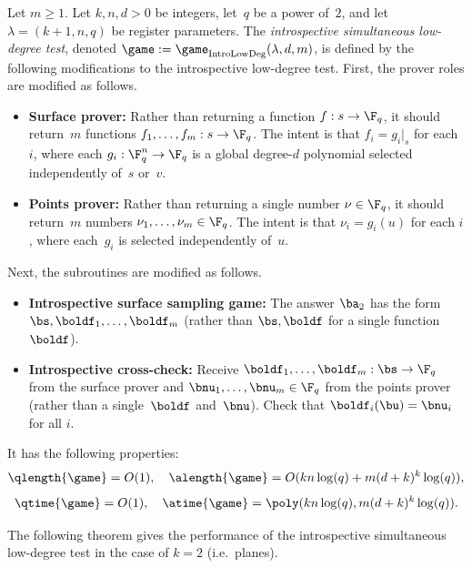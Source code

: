 \begin{definition}
Let $m \geq 1$.
Let $k, n, d>0$ be integers, let~$q$ be a power of~$2$,
and let $\lambda = (k+1, n, q)$ be register parameters.
The \emph{introspective simultaneous low-degree test}, denoted $\game :=\game_{\mathrm{IntroLowDeg}}(\lambda, d, m)$,
is defined by the following modifications to the introspective low-degree test.
First, the prover roles are modified as follows.
\begin{itemize}
\item[$\circ$] \textbf{Surface prover:} Rather than returning a function $f:s\rightarrow \F_q$, it should return~$m$ functions $f_1, \ldots, f_m : s\rightarrow \F_q$.
			The intent is that $f_i = g_i |_{s}$ for each $i$, where each $g_i :\F_q^n \rightarrow \F_q$ is a global degree-$d$ polynomial
				selected independently of~$s$ or~$v$.
\item[$\circ$] \textbf{Points prover:} Rather than returning a single number $\nu \in \F_q$, it should return~$m$ numbers $\nu_1, \ldots, \nu_m \in \F_q$.
			The intent is that $\nu_i = g_i(u)$ for each $i$, where each~$g_i$ is selected independently of~$u$.
\end{itemize}
Next, the subroutines are modified as follows.
\begin{itemize}
\item[$\circ$] \textbf{Introspective surface sampling game:} The answer $\ba_2$ has the
  form $\bs, \boldf_1, \ldots, \boldf_m$ (rather than $\bs, \boldf$
  for a single function $\boldf$).
\item[$\circ$] \textbf{Introspective cross-check:} Receive $\boldf_1, \ldots, \boldf_m : \bs \rightarrow \F_q$ from the surface prover and $\bnu_1, \ldots, \bnu_m \in \F_q$ from the points prover
				(rather than a single~$\boldf$ and~$\bnu$). Check that $\boldf_i(\bu) = \bnu_i$ for all $i$.
\end{itemize}
It has the following properties:
\begin{equation*}
\qlength{\game} = O(1), \quad
\alength{\game} = O(k n \log(q) + m (d+k)^k \log(q)),
\end{equation*}
\begin{equation*}
\qtime{\game} = O(1), \quad
\atime{\game} = \poly(k n \log(q), m (d+k)^k \log(q)).
\end{equation*}
\end{definition}

The following theorem gives the performance of the introspective simultaneous low-degree test in the case of $k=2$ (i.e.\ planes).

